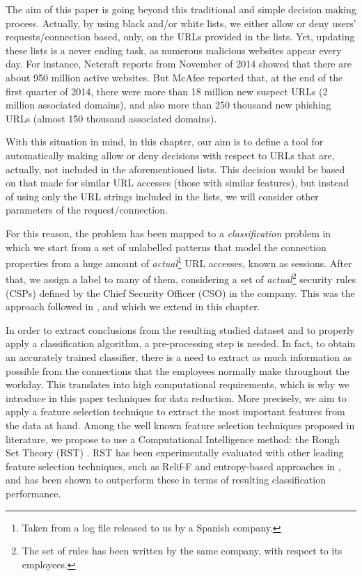 \documentclass{llncs}
\begin{document}
The aim of this paper is going beyond this traditional and simple decision making process. Actually, by using black 
and/or white lists, we either allow or deny users' requests/connection based, only, on the URLs provided in the lists. 
Yet, updating these lists is a never ending task, as numerous malicious websites appear every day. 
For instance, Netcraft reports from November of 2014 \cite{netcraft:site} showed that there are about 950 
million active websites. But McAfee reported \cite{mcafee:site} that, at the end of the first quarter of 2014, 
there were more than 18 million new suspect URLs (2 million associated domains), and also more than 250 thousand 
new phishing URLs (almost 150 thousand associated domains).

With this situation in mind, in this chapter, our aim is to define a tool for automatically making allow or 
deny decisions with respect to URLs that are, actually, not included in the aforementioned lists. This decision 
would be based on that made for similar URL accesses (those with similar features), but instead of using only 
the URL strings included in the lists, we will consider other parameters of the request/connection.

For this reason, the problem has been mapped to a \textit{classification} problem in which we start from a set of 
unlabelled patterns that model the connection properties from a huge amount of \textit{actual}\footnote{Taken from a 
log file released to   us by a  Spanish company.} URL accesses, known as sessions. After that, we assign a label to many 
of them, considering a set of \textit{actual}\footnote{The set of rules has been written by the same   company, with respect 
to its employees.} security rules (CSPs) defined by the Chief Security Officer (CSO) in the company. This was the approach 
followed in \cite{ECTA}, and which we extend in this chapter.

In order to extract conclusions from the resulting studied dataset and to properly apply a classification algorithm, 
a pre-processing step is needed. In fact, to obtain an accurately trained classifier, there is a need to extract as much 
information as possible from the connections
that the employees normally make throughout the workday. This translates into high computational requirements, which is 
why we introduce in this paper  techniques for data reduction. More precisely, we aim to apply a feature selection 
technique to extract the most important features from the data at hand. Among the well known feature selection techniques 
proposed in literature, we propose to use a Computational Intelligence method: the Rough Set Theory (RST) \cite{pawlak2008rough}. RST has been experimentally 
evaluated with other leading feature selection techniques, such as Relif-F and entropy-based approaches 
in \cite{jensen2007fuzzy}, and has been shown to outperform these in terms of resulting classification performance.
 
\end{document}
